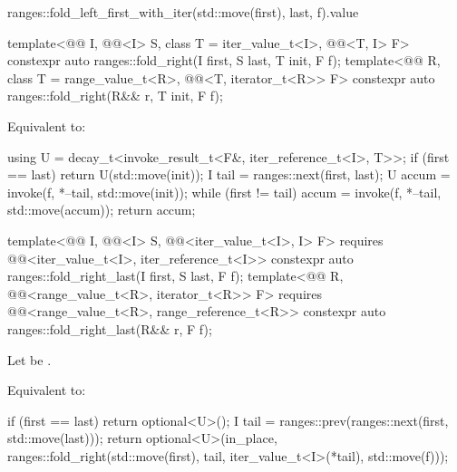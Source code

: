 \begin{itemdescr}
\pnum
\returns
\begin{codeblock}
ranges::fold_left_first_with_iter(std::move(first), last, f).value
\end{codeblock}
\end{itemdescr}

%
\begin{itemdecl}
template<@@ I, @@<I> S, class T = iter_value_t<I>,
         @@<T, I> F>
  constexpr auto ranges::fold_right(I first, S last, T init, F f);
template<@@ R, class T = range_value_t<R>,
         @@<T, iterator_t<R>> F>
  constexpr auto ranges::fold_right(R&& r, T init, F f);
\end{itemdecl}

\begin{itemdescr}
\pnum
\effects
Equivalent to:
\begin{codeblock}
using U = decay_t<invoke_result_t<F&, iter_reference_t<I>, T>>;
if (first == last)
  return U(std::move(init));
I tail = ranges::next(first, last);
U accum = invoke(f, *--tail, std::move(init));
while (first != tail)
  accum = invoke(f, *--tail, std::move(accum));
return accum;
\end{codeblock}
\end{itemdescr}

%
\begin{itemdecl}
template<@@ I, @@<I> S,
         @@<iter_value_t<I>, I> F>
  requires @@<iter_value_t<I>, iter_reference_t<I>>
  constexpr auto ranges::fold_right_last(I first, S last, F f);
template<@@ R,
         @@<range_value_t<R>, iterator_t<R>> F>
  requires @@<range_value_t<R>, range_reference_t<R>>
  constexpr auto ranges::fold_right_last(R&& r, F f);
\end{itemdecl}

\begin{itemdescr}
\pnum
Let  be
.

\pnum
\effects
Equivalent to:
\begin{codeblock}
if (first == last)
  return optional<U>();
I tail = ranges::prev(ranges::next(first, std::move(last)));
return optional<U>(in_place,
  ranges::fold_right(std::move(first), tail, iter_value_t<I>(*tail), std::move(f)));
\end{codeblock}
\end{itemdescr}

